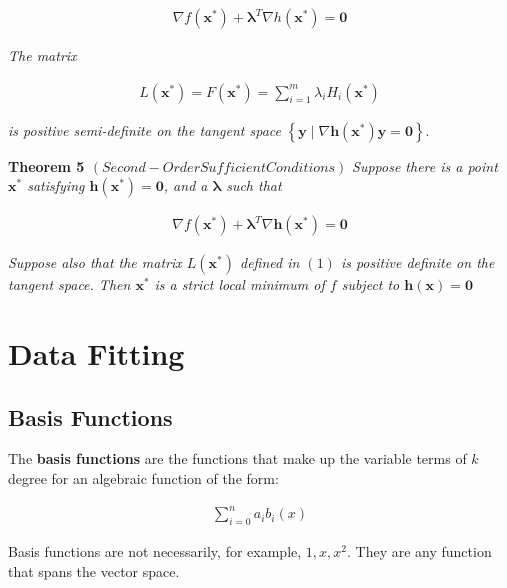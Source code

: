 \documentclass[11pt]{article}
\begin{document}
\begin{align*}
    \nabla f\left(\boldsymbol{x}^{*}\right) + \boldsymbol{\lambda}^{T}\nabla h\left(\boldsymbol{x}^{*}\right) = \boldsymbol{0}
\end{align*}

\emph{The matrix}

\begin{align}
    L\left(\boldsymbol{x}^{*}\right) = F\left(\boldsymbol{x}^{*}\right) = \sum_{i = 1}^{m}\lambda_{i}H_{i}\left(\boldsymbol{x}^{*}\right)
\end{align}

\emph{is positive semi-definite on the tangent space} \(\left\lbrace \boldsymbol{y} \mid \nabla\boldsymbol{h}\left(\boldsymbol{x}^{*}\right)\boldsymbol{y} = \boldsymbol{0}\right\rbrace\).

\textbf{Theorem 5 \(\left(Second-Order Sufficient Conditions\right)\)} \emph{Suppose there is a point \(\boldsymbol{x}^{*}\) satisfying \(\boldsymbol{h}\left(\boldsymbol{x}^{*}\right) = \boldsymbol{0}\), and a \(\boldsymbol{\lambda}\) such that}

\begin{align*}
    \nabla f\left(\boldsymbol{x}^{*}\right) + \boldsymbol{\lambda}^{T}\nabla\boldsymbol{h}\left(\boldsymbol{x}^{*}\right) = \boldsymbol{0}
\end{align*}

\emph{Suppose also that the matrix \(L\left(\boldsymbol{x}^{*}\right)\) defined in \(\left(1\right)\) is positive definite on the tangent space. Then \(\boldsymbol{x}^{*}\) is a strict local minimum of \(f\) subject to \(\boldsymbol{h}\left(\boldsymbol{x}\right) = \boldsymbol{0}\)}

\section{Data Fitting}
\label{sec:orgec66260}
\subsection{Basis Functions}
\label{sec:org85b9c1b}
The \textbf{basis functions} are the functions that make up the variable terms of \(k\) degree for an algebraic function of the form:

\begin{align*}
    \sum_{i = 0}^{n} a_{i}b_{i}\left(x\right)
\end{align*}

Basis functions are not necessarily, for example, \(1, x, x^{2}\). They are any function that spans the vector space.
\end{document}
